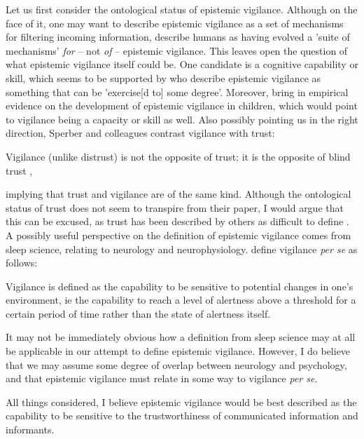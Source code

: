 Let us first consider the ontological status of epistemic vigilance. Although on the face of it, one may want to describe epistemic vigilance as a set of mechanisms for filtering incoming information, \citet{Sperber10} describe humans as having evolved a 'suite of mechanisms' \emph{for} -- not \emph{of} -- epistemic vigilance. This leaves open the question of what epistemic vigilance itself could be. One candidate is a cognitive capability or skill, which seems to be supported by \citet[p.~60]{MS11} who describe epistemic vigilance as something that can be 'exercise[d to] some degree'. Moreover, \citet[\S 5]{Sperber10} bring in empirical evidence on the development of epistemic vigilance in children, which would point to vigilance being a capacity or skill as well.
Also possibly pointing us in the right direction, Sperber and colleagues contrast vigilance with trust:
\begin{quoting}
    Vigilance (unlike distrust) is not the opposite of trust; it is the opposite
of blind trust
    \hfill \citep[p.~363]{Sperber10},
\end{quoting}
implying that trust and vigilance are of the same kind. Although the ontological status of trust does not seem to transpire from their \citeyear{Sperber10} paper, I would argue that this can be excused, as trust has been described by others as difficult to define \citep{Simpson12,McKnight00}.
A possibly useful perspective on the definition of epistemic vigilance comes from sleep science, relating to neurology and neurophysiology. \citet{VanSchie21} define vigilance \emph{per se} as follows:
\begin{quoting}
    Vigilance is defined as the capability to be sensitive to potential changes in one's environment, ie the capability to reach a level of alertness above a threshold for a certain period of time rather than the state of alertness itself.
    \hfill \citep[p.~175]{VanSchie21}
\end{quoting}
It may not be immediately obvious how a definition from sleep science may at all be applicable in our attempt to define epistemic vigilance. However, I do believe that we may assume some degree of overlap between neurology and psychology, and that epistemic vigilance must relate in some way to vigilance \emph{per se}.

All things considered, I believe epistemic vigilance would be best described as the capability to be sensitive to the trustworthiness of communicated information and informants.

